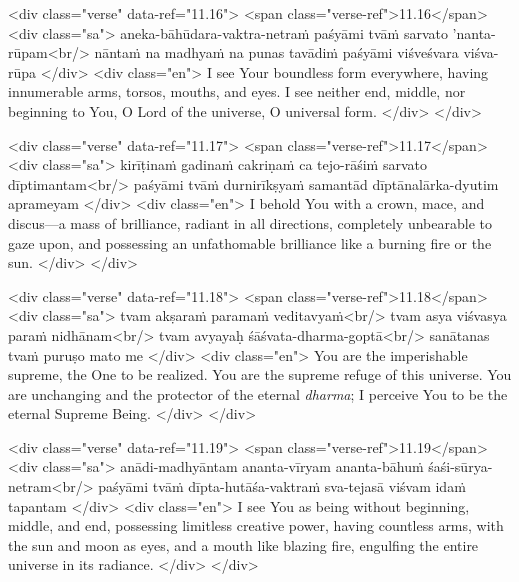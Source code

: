 \begin{html}
<div class="verse" data-ref="11.16">
  <span class="verse-ref">11.16</span>
  <div class="sa">
    aneka-bāhūdara-vaktra-netraṁ paśyāmi tvāṁ sarvato ’nanta-rūpam<br/>
    nāntaṁ na madhyaṁ na punas tavādiṁ paśyāmi viśveśvara viśva-rūpa
  </div>
  <div class="en">
    I see Your boundless form everywhere, having innumerable arms, torsos, mouths, and eyes. I see neither end, middle, nor beginning to You, O Lord of the universe, O universal form.
  </div>
</div>
\end{html}



\begin{html}
<div class="verse" data-ref="11.17">
  <span class="verse-ref">11.17</span>
  <div class="sa">
    kirīṭinaṁ gadinaṁ cakriṇaṁ ca tejo-rāśiṁ sarvato dīptimantam<br/>
    paśyāmi tvāṁ durnirīkṣyaṁ samantād dīptānalārka-dyutim aprameyam
  </div>
  <div class="en">
    I behold You with a crown, mace, and discus---a mass of brilliance, radiant in all directions, completely unbearable to gaze upon, and possessing an unfathomable brilliance like a burning fire or the sun.
  </div>
</div>
\end{html}



\begin{html}
<div class="verse" data-ref="11.18">
  <span class="verse-ref">11.18</span>
  <div class="sa">
    tvam akṣaraṁ paramaṁ veditavyaṁ<br/>
    tvam asya viśvasya paraṁ nidhānam<br/>
    tvam avyayaḥ śāśvata-dharma-goptā<br/>
    sanātanas tvaṁ puruṣo mato me
  </div>
  <div class="en">
    You are the imperishable supreme, the One to be realized. You are the supreme refuge of this universe. You are unchanging and the protector of the eternal \textit{dharma}; I perceive You to be the eternal Supreme Being.
  </div>
</div>
\end{html}



\begin{html}
<div class="verse" data-ref="11.19">
  <span class="verse-ref">11.19</span>
  <div class="sa">
    anādi-madhyāntam ananta-vīryam ananta-bāhuṁ śaśi-sūrya-netram<br/>
    paśyāmi tvāṁ dīpta-hutāśa-vaktraṁ sva-tejasā viśvam idaṁ tapantam
  </div>
  <div class="en">
    I see You as being without beginning, middle, and end, possessing limitless creative power, having countless arms, with the sun and moon as eyes, and a mouth like blazing fire, engulfing the entire universe in its radiance.
  </div>
</div>
\end{html}


